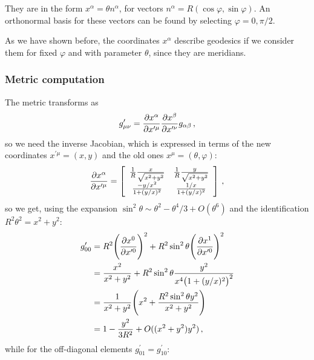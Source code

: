 \documentclass[main.tex]{subfiles}
\begin{document}
They are in the form \(x^{\alpha } = \theta n^{\alpha }\), for vectors \(n^{\alpha } = R (\cos \varphi, \sin \varphi )\).
An orthonormal basis for these vectors can be found by selecting \(\varphi = 0, \pi /2\). 

As we have shown before, the coordinates \(x^{\alpha }\) describe geodesics if we consider them for fixed \(\varphi \) and with parameter \(\theta \), since they are meridians.

\subsubsection{Metric computation}

The metric transforms as 
%
\begin{align}
  g_{\mu \nu }^{\prime } 
  = \pdv{x^{\alpha }}{x^{\prime \mu }}
  \pdv{x^{\beta }}{x^{\prime  \nu }}
  g_{\alpha \beta }
\,,
\end{align}
%
so we need the inverse Jacobian, which is expressed in terms of the new coordinates \(x^{\prime \mu } = (x, y)\) and the old ones \(x^{\mu } = (\theta , \varphi )\):
%
\begin{subequations}
\begin{align}
  \pdv{x^{\alpha }}{x^{\prime \mu }}
  = \left[\begin{array}{cc}
  \frac{1}{R} \frac{x}{\sqrt{x^2 + y^2}} & 
  \frac{1}{R} \frac{y}{\sqrt{x^2 + y^2}} \\ 
  \frac{-y / x^2}{1 + (y/x)^2} & 
  \frac{1/x}{1 + (y/x)^2}
  \end{array}\right]
\,,
\end{align}
\end{subequations}
%
so we get, using the expansion \(\sin^2\theta \sim \theta^2 - \theta^{4} /3 + O (\theta^{6})\) and the identification \(R^2\theta^2 = x^2+y^2\):
%
\begin{subequations}
\begin{align}
  g_{00}^{\prime } &= R^2 \qty(\pdv{x^{0}}{x^{\prime 0}})^2
  + R^2 \sin^2 \theta \qty(\pdv{x^{1}}{x^{\prime 0}})^2  \\
  &= \frac{x^2}{x^2+y^2} + R^2 \sin^2 \theta \frac{y^2}{x^{4} \qty(1 + (y/x)^2)^2}  \\
  &=\frac{1}{x^2+y^2} \qty(x^2 + \frac{R^2 \sin^2\theta y^2}{x^2+y^2})  \\
  &= 1 - \frac{y^2}{3R^2} + O((x^2+y^2)y^2)
\,,
\end{align}
\end{subequations}
%
while for the off-diagonal elements \(g_{01}^{\prime } = g_{10}^{\prime }\): 
\end{document}

